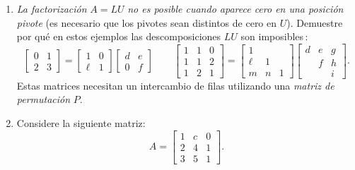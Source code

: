 \begin{enumerate}
\item \emph{La factorización} $A=LU$ \emph{no es posible cuando aparece cero en una posición pivote} (es necesario que los pivotes sean distintos de cero en $U$). Demuestre por qué en estos ejemplos las descomposiciones $LU$ son imposibles\,: %
%
\begin{displaymath}
  \begin{bmatrix} 0 & 1\\ 2 & 3\end{bmatrix}=
  \begin{bmatrix} 1 & 0\\ \ell & 1\end{bmatrix}
  \begin{bmatrix} d & e\\ 0 & f\end{bmatrix}
  \qquad\begin{bmatrix} 1 & 1 & 0\\ 1 & 1 & 2\\
    1 & 2 & 1\end{bmatrix}=\begin{bmatrix} 1\\
    \ell & 1\\ m & n & 1\end{bmatrix}
  \begin{bmatrix} d & e & g\\
    & f & h\\ && i\end{bmatrix}.
\end{displaymath}
Estas matrices necesitan un intercambio de filas utilizando una \emph{matriz de permutación} $P$.



\item
Considere la siguiente matriz:
\begin{displaymath}
  A=\begin{bmatrix}
    1 & c & 0\\ 2 & 4 & 1\\ 3 & 5 & 1
  \end{bmatrix}.
\end{displaymath}


\end{enumerate}
